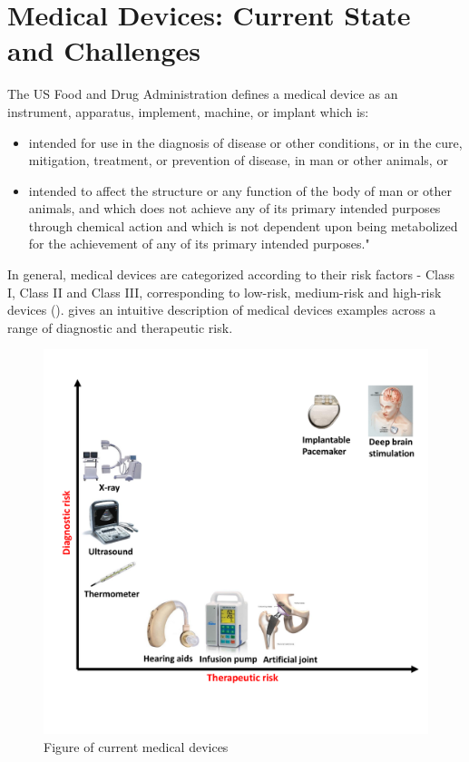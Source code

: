 \chapter{Medical Devices: Current State and Challenges}
The US Food and Drug Administration defines a medical device as an instrument, apparatus, implement, machine, or implant which is:
\begin{itemize}
	\item intended for use in the diagnosis of disease or other conditions, or in the cure, mitigation, treatment, or prevention of disease, in man or other animals, or
	\item intended to affect the structure or any function of the body of man or other animals, and which does not achieve any of its primary intended purposes through chemical action and which is not dependent upon being metabolized for the achievement of any of its primary intended purposes."
\end{itemize}

In general, medical devices are categorized according to their risk factors - Class I, Class II and Class III, corresponding to low-risk, medium-risk and high-risk devices (\cite{class}).   gives an intuitive description of medical devices examples across a range of diagnostic and therapeutic risk.
\begin{figure}[t]
		\centering
		\includegraphics[width=\textwidth]{figs/devices_new.pdf}
		\caption{\small Figure of current medical devices}
		\label{fig:Cur}
\end{figure}

